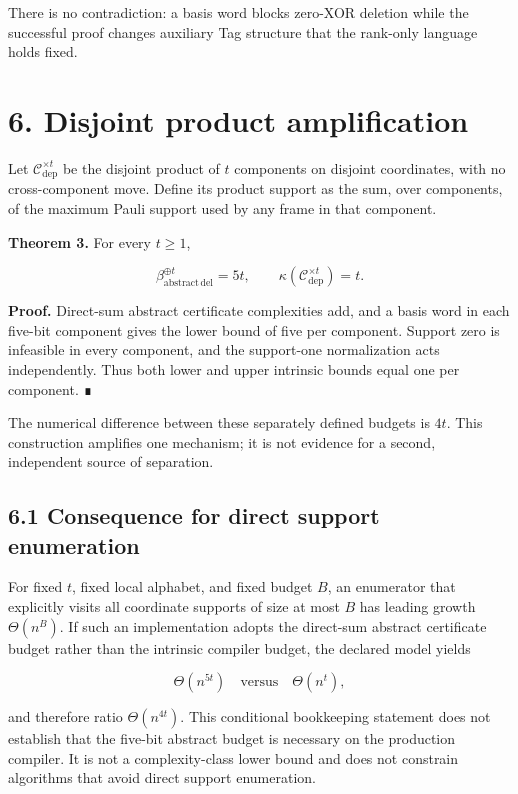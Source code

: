 \documentclass[
  11pt,
]{article}
\begin{document}
There is no contradiction: a basis word blocks zero-XOR deletion while
the successful proof changes auxiliary Tag structure that the rank-only
language holds fixed.

\hypertarget{disjoint-product-amplification}{%
\section{6. Disjoint product
amplification}\label{disjoint-product-amplification}}

Let \(\mathcal C_{\mathrm{dep}}^{\times t}\) be the disjoint product of
\(t\) components on disjoint coordinates, with no cross-component move.
Define its product support as the sum, over components, of the maximum
Pauli support used by any frame in that component.

\textbf{Theorem 3.} For every \(t\ge1\),

\[
\beta_{\mathrm{abstract\,del}}^{\oplus t}=5t,
\qquad
\kappa(\mathcal C_{\mathrm{dep}}^{\times t})=t.
\]

\textbf{Proof.} Direct-sum abstract certificate complexities add, and a
basis word in each five-bit component gives the lower bound of five per
component. Support zero is infeasible in every component, and the
support-one normalization acts independently. Thus both lower and upper
intrinsic bounds equal one per component. ∎

The numerical difference between these separately defined budgets is
\(4t\). This construction amplifies one mechanism; it is not evidence
for a second, independent source of separation.

\hypertarget{consequence-for-direct-support-enumeration}{%
\subsection{6.1 Consequence for direct support
enumeration}\label{consequence-for-direct-support-enumeration}}

For fixed \(t\), fixed local alphabet, and fixed budget \(B\), an
enumerator that explicitly visits all coordinate supports of size at
most \(B\) has leading growth \(\Theta(n^B)\). If such an implementation
adopts the direct-sum abstract certificate budget rather than the
intrinsic compiler budget, the declared model yields

\[
\Theta(n^{5t})\quad\text{versus}\quad\Theta(n^t),
\]

and therefore ratio \(\Theta(n^{4t})\). This conditional bookkeeping
statement does not establish that the five-bit abstract budget is
necessary on the production compiler. It is not a complexity-class lower
bound and does not constrain algorithms that avoid direct support
enumeration.
\end{document}
